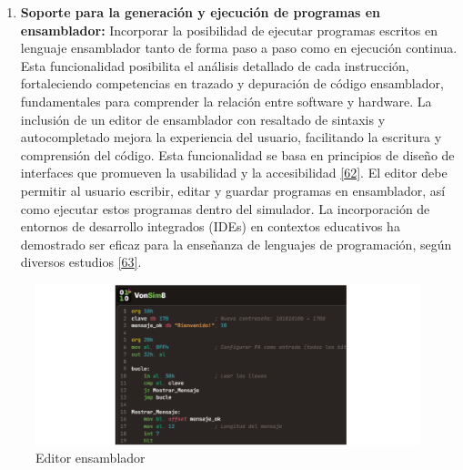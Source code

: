 \documentclass[12pt,oneside]{templates/unerthesis}
\providecommand{\tightlist}{%
  \setlength{\itemsep}{0pt}\setlength{\parskip}{0pt}}
\begin{document}
\begin{enumerate}
\def\labelenumi{\arabic{enumi}.}
\setcounter{enumi}{1}
\tightlist
\item
  \textbf{Soporte para la generación y ejecución de programas en ensamblador:}
  Incorporar la posibilidad de ejecutar programas escritos en lenguaje ensamblador tanto de forma paso a paso como en ejecución continua. Esta funcionalidad posibilita el análisis detallado de cada instrucción, fortaleciendo competencias en trazado y depuración de código ensamblador, fundamentales para comprender la relación entre software y hardware.
  La inclusión de un editor de ensamblador con resaltado de sintaxis y autocompletado mejora la experiencia del usuario, facilitando la escritura y comprensión del código. Esta funcionalidad se basa en principios de diseño de interfaces que promueven la usabilidad y la accesibilidad \protect\hyperlink{ref-w3c_accessibility_2021}{{[}62{]}}. El editor debe permitir al usuario escribir, editar y guardar programas en ensamblador, así como ejecutar estos programas dentro del simulador. La incorporación de entornos de desarrollo integrados (IDEs) en contextos educativos ha demostrado ser eficaz para la enseñanza de lenguajes de programación, según diversos estudios \protect\hyperlink{ref-mccracken2001does}{{[}63{]}}.
\end{enumerate}

\begin{figure}

{\centering \includegraphics[width=0.9\linewidth]{images/editor} 

}

\caption{Editor ensamblador}\label{fig:editor}
\end{figure}
\end{document}
